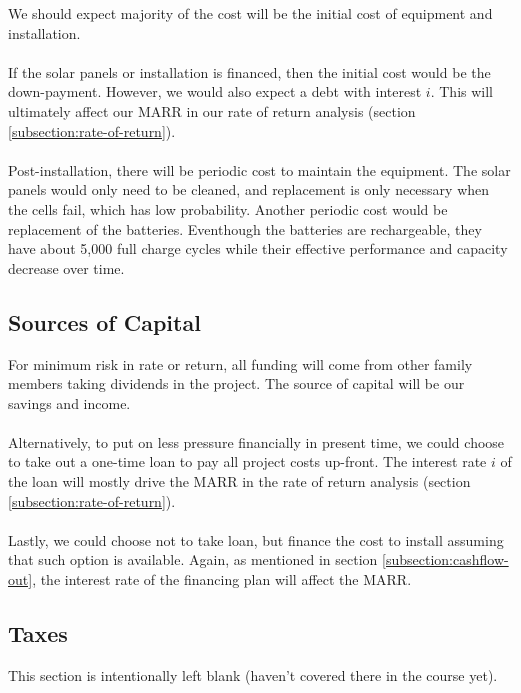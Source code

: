\documentclass[10pt,letterpaper]{article}
\begin{document}
We should expect majority of the cost will be the initial cost of equipment and installation.\\
\\
If the solar panels or installation is financed, then the initial cost would be the down-payment. However, we would also expect a debt with interest $i$. This will ultimately affect our MARR in our rate of return analysis (section \ref{subsection:rate-of-return}).\\
\\
Post-installation, there will be periodic cost to maintain the equipment. The solar panels would only need to be cleaned, and replacement is only necessary when the cells fail, which has low probability. Another periodic cost would be replacement of the batteries. Eventhough the batteries are rechargeable, they have about 5,000 full charge cycles while their effective performance and capacity decrease over time\cite{tesla-powerwall-wiki}.\\

\subsection{Sources of Capital}

For minimum risk in rate or return, all funding will come from other family members taking dividends in the project. The source of capital will be our savings and income.\\
\\
Alternatively, to put on less pressure financially in present time, we could choose to take out a one-time loan to pay all project costs up-front. The interest rate $i$ of the loan will mostly drive the MARR in the rate of return analysis (section \ref{subsection:rate-of-return}).\\
\\
Lastly, we could choose not to take loan, but finance the cost to install assuming that such option is available. Again, as mentioned in section \ref{subsection:cashflow-out}, the interest rate of the financing plan will affect the MARR.\\

\subsection{Taxes}
\begin{center}
	This section is intentionally left blank (haven't covered there in the course yet).\\
\end{center}
\end{document}
